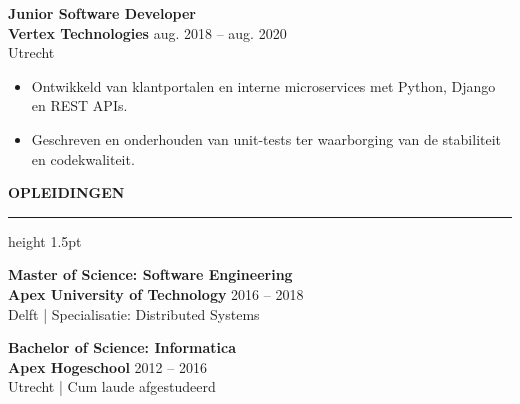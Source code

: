 \documentclass[10pt,a4paper]{article}
\newcommand{\cvsection}[1]{%
  \vspace{4mm}%
  {\color{primary}\large\bfseries\MakeUppercase{#1}}%
  \vspace{1.5mm}%
  {\color{accent}\hrule height 1.5pt}%
  \vspace{2.5mm}%
}
\begin{document}
\begin{minipage}[t]{0.66\textwidth}
  \textbf{\large Junior Software Developer} \\
  {\color{accent}\bfseries Vertex Technologies} \hfill {\color{secondary}\footnotesize aug. 2018 – aug. 2020} \\
  {\color{secondary}\footnotesize Utrecht}
  \begin{itemize}[leftmargin=10pt,topsep=2pt,itemsep=2.5pt,parsep=0pt]
    \item \small Ontwikkeld van klantportalen en interne microservices met Python, Django en REST APIs.
    \item \small Geschreven en onderhouden van unit-tests ter waarborging van de stabiliteit en codekwaliteit.
  \end{itemize}
  
  \cvsection{Opleidingen}
  
  \textbf{\large Master of Science: Software Engineering} \\
  {\color{accent}\bfseries Apex University of Technology} \hfill {\color{secondary}\footnotesize 2016 – 2018} \\
  {\color{secondary}\footnotesize Delft | Specialisatie: Distributed Systems}
  
  \vspace{2.5mm}
  
  \textbf{\large Bachelor of Science: Informatica} \\
  {\color{accent}\bfseries Apex Hogeschool} \hfill {\color{secondary}\footnotesize 2012 – 2016} \\
  {\color{secondary}\footnotesize Utrecht | Cum laude afgestudeerd}
  
\end{minipage}
\end{document}
